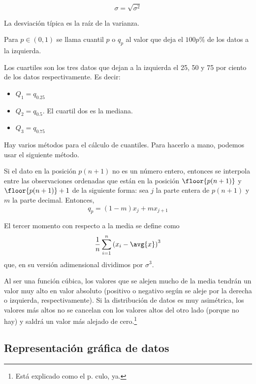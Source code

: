 \documentclass{apuntes}
\begin{document}
\begin{defn}
\[\sigma = \sqrt{\sigma^2} \]

La desviación típica es la raíz de la varianza.
\end{defn}

\begin{defn}[Cuantil]
Para $p\in (0, 1)$ se llama cuantil $p$ o $q_p$ al valor que deja el $100p \%$ de los datos a la izquierda.
\end{defn}

\begin{defn}[Cuartil]
Los cuartiles son los tres datos que dejan a la izquierda el 25, 50 y 75 por ciento de los datos respectivamente. Es decir:

\begin{itemize}
\item $Q_1 = q_{0.25}$
\item $Q_2 = q_{0.5}$. El cuartil dos es la mediana.
\item $Q_3 = q_{0.75}$
\end{itemize}
\end{defn}

Hay varios métodos para el cálculo de cuantiles. Para hacerlo a mano, podemos usar el siguiente método.

Si el dato en la posición $p(n+1)$ no es un número entero, entonces se interpola entre las observaciones ordenadas que están en la posición $\floor{p(n+1)}$ y $\floor{p(n+1)} + 1$ de la siguiente forma: sea $j$ la parte entera de $p(n+1)$ y $m$ la parte decimal. Entonces, \[ q_p = (1-m)x_j + m x_{j+1} \]


\begin{defn}
El tercer momento con respecto a la media se define como \[ \frac{1}{n}\sum_{i=1}^n\left(x_i-\avg{x}\right)^3 \] que, en su versión adimensional dividimos por $\sigma^3$.
\end{defn}

Al ser una función cúbica, los valores que se alejen mucho de la media tendrán un valor muy alto en valor absoluto (positivo o negativo según se aleje por la derecha o izquierda, respectivamente). Si la distribución de datos es muy asimétrica, los valores más altos no se cancelan con los valores altos del otro lado (porque no hay) y saldrá un valor más alejado de cero.\footnote{Está explicado como el p. culo, ya.}

\subsection{Representación gráfica de datos}
\end{document}
